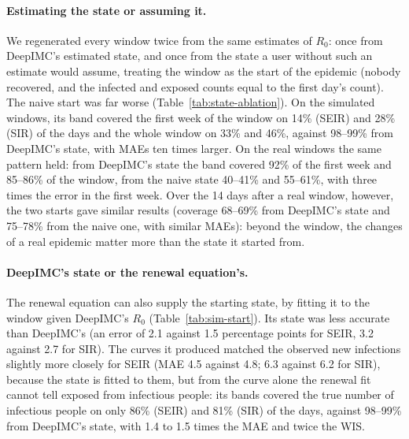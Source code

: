 \documentclass[12pt]{article}
\begin{document}
\paragraph{Estimating the state or assuming it.} We regenerated every window twice from the same estimates of
$R_0$: once from DeepIMC's estimated state, and once from the state a user without such an estimate would assume,
treating the window as the start of the epidemic (nobody recovered, and the infected and exposed counts equal to
the first day's count). The naive start was far worse (Table~\ref{tab:state-ablation}). On the simulated
windows, its band covered the first week of the window on 14\% (SEIR) and 28\% (SIR) of the days and the whole
window on 33\% and 46\%, against 98--99\% from DeepIMC's state, with MAEs ten times larger. On the real windows
the same pattern held: from DeepIMC's state the band covered 92\% of the first week and 85--86\% of the window,
from the naive state 40--41\% and 55--61\%, with three times the error in the first week. Over the 14 days after
a real window, however, the two starts gave similar results (coverage 68--69\% from DeepIMC's state and 75--78\%
from the naive one, with similar MAEs): beyond the window, the changes of a real epidemic matter more than the
state it started from.

\begin{table}[htbp]
\centering
\caption{The same DeepIMC estimates of $R_0$ started from DeepIMC's estimated state or from a naive state (the
window is treated as the start of the epidemic: nobody has recovered, and the infected and exposed counts equal
the first day's count): coverage (\%) and MAE of the daily counts in the first 7 days of the window, in the whole
window and in the next 14 days. Simulated: 1,000 test windows (500 per model); real: the windows of the five
datasets.}
\label{tab:state-ablation}
\small
\resizebox{\textwidth}{!}{}
\end{table}

\paragraph{DeepIMC's state or the renewal equation's.} The renewal equation can also supply the starting
state, by fitting it to the window given DeepIMC's $R_0$ (Table~\ref{tab:sim-start}). Its state was less accurate
than DeepIMC's (an error of 2.1 against 1.5 percentage points for SEIR, 3.2 against 2.7 for SIR). The curves it
produced matched the observed new infections slightly more closely for SEIR (MAE 4.5 against 4.8; 6.3 against
6.2 for SIR), because the state is fitted to them, but from the curve alone the renewal fit cannot tell exposed
from infectious people: its bands covered the true number of infectious people on only 86\% (SEIR) and 81\% (SIR)
of the days, against 98--99\% from DeepIMC's state, with 1.4 to 1.5 times the MAE and twice the WIS.
\end{document}
